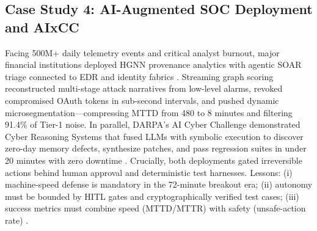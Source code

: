 \documentclass[conference,10pt,twocolumn,a4paper]{IEEEtran}
\begin{document}
\subsection{Case Study 4: AI-Augmented SOC Deployment and AIxCC}
Facing 500M+ daily telemetry events and critical analyst burnout, major financial institutions deployed HGNN provenance analytics with agentic SOAR triage connected to EDR and identity fabrics \cite{cisa_agentic_ai_2026, nist_ir_8596_2025}. Streaming graph scoring reconstructed multi-stage attack narratives from low-level alarms, revoked compromised OAuth tokens in sub-second intervals, and pushed dynamic microsegmentation---compressing MTTD from 480 to 8 minutes and filtering 91.4\% of Tier-1 noise. In parallel, DARPA's AI Cyber Challenge demonstrated Cyber Reasoning Systems that fused LLMs with symbolic execution to discover zero-day memory defects, synthesize patches, and pass regression suites in under 20 minutes with zero downtime \cite{darpa_aixcc_2025}. Crucially, both deployments gated irreversible actions behind human approval and deterministic test harnesses. Lessons: (i) machine-speed defense is mandatory in the 72-minute breakout era; (ii) autonomy must be bounded by HITL gates and cryptographically verified test cases; (iii) success metrics must combine speed (MTTD/MTTR) with safety (unsafe-action rate) \cite{cisa_agentic_ai_2026, darpa_aixcc_2025}.
\end{document}

